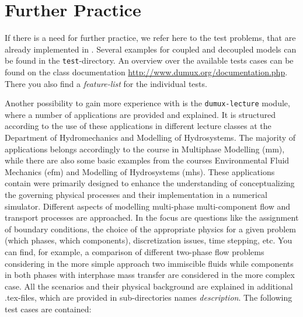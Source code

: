 \section{Further Practice}
\label{tutorial-furtherpractice}

If there is a need for further practice, we refer here to the test problems, that
are already implemented in \Dumux. Several examples for coupled and decoupled models
can be found in the \texttt{test}-directory. An overview over the available tests
cases can be found on the class documentation \url{http://www.dumux.org/documentation.php}.
There you also find a \emph{feature-list} for the individual tests.

Another possibility to gain more experience with \Dumux is the \texttt{dumux-lecture} module, where 
a number of \Dumux applications are provided and explained. It is structured according to
the use of these applications in different lecture classes at the Department of Hydromechanics and
Modelling of Hydrosystems. The majority of applications belongs accordingly to the 
course in Multiphase Modelling (mm), while there are also some basic examples from the
courses Environmental Fluid Mechanics (efm) and Modelling of Hydrosystems (mhs). 
These applications contain were primarily designed to enhance the understanding of conceptualizing the
governing physical processes and their implementation in a numerical simulator. 
Different aspects of modelling multi-phase multi-component flow and transport processes are approached.
In the focus are questions like the assignment of boundary conditions, the choice of the 
appropriate physics for a given problem (which phases, which components), discretization issues,
time stepping, etc. 
You can find, for example, a comparison of different two-phase flow problems considering in
the more simple approach two immiscible fluids while components in both phases with interphase
mass transfer are considered in the more complex case.
All the scenarios and their physical background are explained in additional .tex-files,
which are provided in sub-directories names \emph{description}. The following test cases are 
contained:
